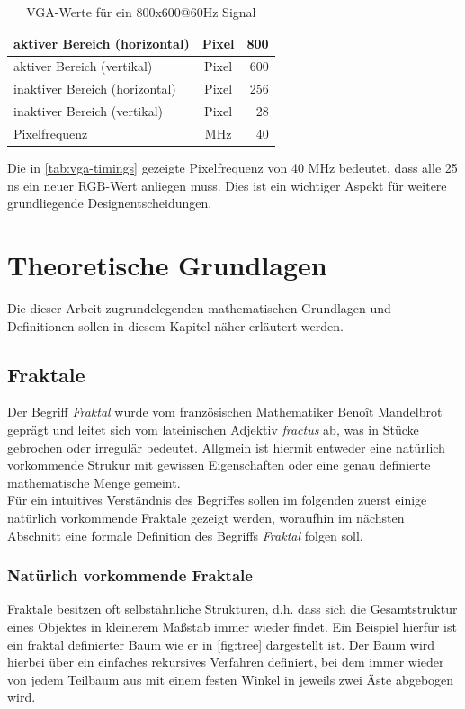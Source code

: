 \documentclass[a4paper,12pt,onesided]{report}
\begin{document}
\begin{table}[H]
	\centering
	\begin{tabular}{|l|c|r|}	
		\hline
		aktiver Bereich (horizontal) & Pixel & 800 \\ \hline
		aktiver Bereich (vertikal) & Pixel & 600 \\ \hline
		inaktiver Bereich (horizontal) & Pixel & 256 \\ \hline
		inaktiver Bereich (vertikal) & Pixel & 28 \\ \hline
		Pixelfrequenz & MHz & 40 \\ \hline
	\end{tabular}
	\caption{VGA-Werte für ein 800x600@60Hz Signal}
	\label{tab:vga-timings}
\end{table}

Die in \autoref{tab:vga-timings} gezeigte Pixelfrequenz von 40 MHz bedeutet, dass alle 25 ns ein neuer RGB-Wert anliegen muss. Dies ist ein wichtiger Aspekt für weitere grundliegende Designentscheidungen. %

\chapter{Theoretische Grundlagen}
Die dieser Arbeit zugrundelegenden mathematischen Grundlagen und Definitionen sollen in diesem Kapitel näher erläutert werden.

\section{Fraktale}
Der Begriff \textit{Fraktal} wurde vom französischen Mathematiker Benoît Mandelbrot geprägt und leitet sich vom lateinischen Adjektiv \textit{fractus} ab, was \glqq in Stücke gebrochen\grqq{} oder \glqq irregulär\grqq{} bedeutet. Allgmein ist hiermit entweder eine natürlich vorkommende Strukur mit gewissen Eigenschaften oder eine genau definierte mathematische Menge gemeint. \cite[S. 16]{mandelbrot2013fraktale}\\
Für ein intuitives Verständnis des Begriffes sollen im folgenden zuerst einige natürlich vorkommende Fraktale gezeigt werden, woraufhin im nächsten Abschnitt eine formale Definition des Begriffs \textit{Fraktal} folgen soll.

\subsection{Natürlich vorkommende Fraktale}
\label{sec:natfrac}
Fraktale besitzen oft selbstähnliche Strukturen, d.h. dass sich die Gesamtstruktur eines Objektes in kleinerem Maßstab immer wieder findet. Ein Beispiel hierfür ist ein fraktal definierter Baum wie er in \autoref{fig:tree} dargestellt ist. Der Baum wird hierbei über ein einfaches rekursives Verfahren definiert, bei dem immer wieder von jedem Teilbaum aus mit einem festen Winkel in jeweils zwei Äste abgebogen wird.
\end{document}
